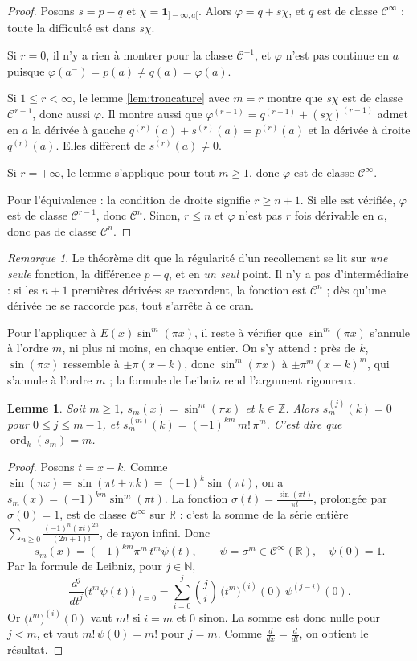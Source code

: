 \documentclass[11pt,a4paper]{article}
\theoremstyle{plain}
\newtheorem{lemme}[theoreme]{Lemme}
\theoremstyle{definition}
\theoremstyle{remark}
\newtheorem{remarque}[theoreme]{Remarque}
\newcommand{\N}{\mathbb{N}}
\newcommand{\Z}{\mathbb{Z}}
\newcommand{\R}{\mathbb{R}}
\newcommand{\Cc}{\mathcal{C}}
\newcommand{\1}{\mathbf{1}}
\DeclareMathOperator{\ord}{ord}
\begin{document}
\begin{proof}
Posons $s=p-q$ et $\chi=\1_{]-\infty,a[}$. Alors $\varphi=q+s\chi$, et $q$ est de classe $\Cc^\infty$ : toute la difficulté est dans $s\chi$.

Si $r=0$, il n'y a rien à montrer pour la classe $\Cc^{-1}$, et $\varphi$ n'est pas continue en $a$ puisque $\varphi(a^-)=p(a)\neq q(a)=\varphi(a)$.

Si $1\leq r<\infty$, le lemme \ref{lem:troncature} avec $m=r$ montre que $s\chi$ est de classe $\Cc^{r-1}$, donc aussi $\varphi$. Il montre aussi que $\varphi^{(r-1)}=q^{(r-1)}+(s\chi)^{(r-1)}$ admet en $a$ la dérivée à gauche $q^{(r)}(a)+s^{(r)}(a)=p^{(r)}(a)$ et la dérivée à droite $q^{(r)}(a)$. Elles diffèrent de $s^{(r)}(a)\neq0$.

Si $r=+\infty$, le lemme s'applique pour tout $m\geq1$, donc $\varphi$ est de classe $\Cc^\infty$.

Pour l'équivalence : la condition de droite signifie $r\geq n+1$. Si elle est vérifiée, $\varphi$ est de classe $\Cc^{r-1}$, donc $\Cc^n$. Sinon, $r\leq n$ et $\varphi$ n'est pas $r$ fois dérivable en $a$, donc pas de classe $\Cc^n$.
\end{proof}

\begin{remarque}
Le théorème dit que la régularité d'un recollement se lit sur \emph{une seule} fonction, la différence $p-q$, et en \emph{un seul} point. Il n'y a pas d'intermédiaire : si les $n+1$ premières dérivées se raccordent, la fonction est $\Cc^n$ ; dès qu'une dérivée ne se raccorde pas, tout s'arrête à ce cran.
\end{remarque}

Pour l'appliquer à $E(x)\sin^m(\pi x)$, il reste à vérifier que $\sin^m(\pi x)$ s'annule à l'ordre $m$, ni plus ni moins, en chaque entier. On s'y attend : près de $k$, $\sin(\pi x)$ ressemble à $\pm\pi(x-k)$, donc $\sin^m(\pi x)$ à $\pm\pi^m(x-k)^m$, qui s'annule à l'ordre $m$ ; la formule de Leibniz rend l'argument rigoureux.

\begin{lemme}\label{lem:ordre-sin}
Soit $m\geq1$, $s_m(x)=\sin^m(\pi x)$ et $k\in\Z$. Alors $s_m^{(j)}(k)=0$ pour $0\leq j\leq m-1$, et $s_m^{(m)}(k)=(-1)^{km}\,m!\,\pi^m$. C'est dire que $\ord_k(s_m)=m$.
\end{lemme}

\begin{proof}
Posons $t=x-k$. Comme $\sin(\pi x)=\sin(\pi t+\pi k)=(-1)^k\sin(\pi t)$, on a $s_m(x)=(-1)^{km}\sin^m(\pi t)$. La fonction $\sigma(t)=\frac{\sin(\pi t)}{\pi t}$, prolongée par $\sigma(0)=1$, est de classe $\Cc^\infty$ sur $\R$ : c'est la somme de la série entière $\sum_{n\geq0}\frac{(-1)^n(\pi t)^{2n}}{(2n+1)!}$, de rayon infini. Donc
\[
  s_m(x)=(-1)^{km}\pi^m\,t^m\psi(t), \qquad \psi=\sigma^m\in\Cc^\infty(\R),\quad \psi(0)=1 .
\]
Par la formule de Leibniz, pour $j\in\N$,
\[
  \frac{d^j}{dt^j}\big(t^m\psi(t)\big)\Big|_{t=0}=\sum_{i=0}^{j}\binom{j}{i}\,\big(t^m\big)^{(i)}(0)\,\psi^{(j-i)}(0).
\]
Or $\big(t^m\big)^{(i)}(0)$ vaut $m!$ si $i=m$ et $0$ sinon. La somme est donc nulle pour $j<m$, et vaut $m!\,\psi(0)=m!$ pour $j=m$. Comme $\frac{d}{dx}=\frac{d}{dt}$, on obtient le résultat.
\end{proof}
\end{document}
